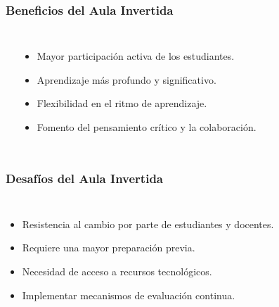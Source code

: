 \begin{frame}
    \frametitle{Beneficios del Aula Invertida}
    \vspace{-5mm}
    \begin{columns}
        \begin{center}
        \end{center}
        \begin{itemize}[leftmargin=*]
            \item Mayor participación activa de los estudiantes.
            \item Aprendizaje más profundo y significativo.
            \item Flexibilidad en el ritmo de aprendizaje.
            \item Fomento del pensamiento crítico y la colaboración.
        \end{itemize}
    \end{columns}
\end{frame}

\begin{frame}
    \frametitle{Desafíos del Aula Invertida}
    \begin{columns}
        \begin{itemize}[leftmargin=*]
            \item Resistencia al cambio por parte de estudiantes y docentes.
            \item Requiere una mayor preparación previa.
            \item Necesidad de acceso a recursos tecnológicos.
            \item Implementar mecanismos de evaluación continua.
        \end{itemize}
        \begin{center}
        \end{center}
    \end{columns}
\end{frame}
